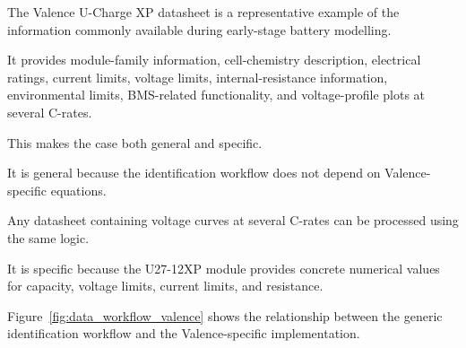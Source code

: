 \documentclass[a4paper,12pt]{article}
\begin{document}
The Valence U-Charge XP datasheet is a representative example of the information commonly available during early-stage battery modelling.

It provides module-family information, cell-chemistry description, electrical ratings, current limits, voltage limits, internal-resistance information, environmental limits, BMS-related functionality, and voltage-profile plots at several C-rates.

This makes the case both general and specific.

It is general because the identification workflow does not depend on Valence-specific equations.

Any datasheet containing voltage curves at several C-rates can be processed using the same logic.

It is specific because the U27-12XP module provides concrete numerical values for capacity, voltage limits, current limits, and resistance.

Figure~\ref{fig:data_workflow_valence} shows the relationship between the generic identification workflow and the Valence-specific implementation.
\end{document}
